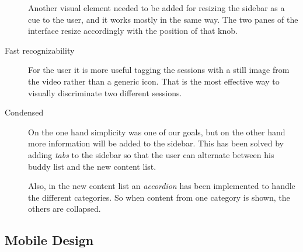\begin{description}
  Another visual element needed to be added for resizing the sidebar as a cue to the user, and it works mostly in the same way.
  The two panes of the interface resize accordingly with the position of that knob.
  \item[Fast recognizability] For the user it is more useful tagging the sessions with a still image from the video rather than a generic icon.
  That is the most effective way to visually discriminate two different sessions.
  \item[Condensed] On the one hand simplicity was one of our goals, but on the other hand more information will be added to the sidebar.
  This has been solved by adding \emph{tabs} to the sidebar so that the user can alternate between his buddy list and the new content list.
  
  Also, in the new content list an \emph{accordion} has been implemented to handle the different categories.
  So when content from one category is shown, the others are collapsed.
\end{description}


\subsection{Mobile Design} %
\label{sub:mobile_design}


